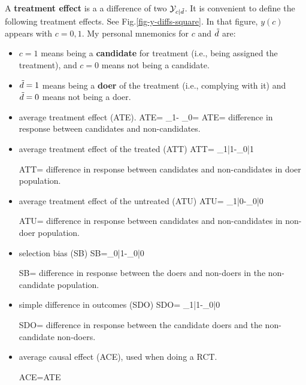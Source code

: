 A {\bf treatment effect} is a
a difference of two  ${\cal Y}_{c|{\tilde{d}} }$.
It is convenient to
define the following 
treatment effects. 
See Fig.\ref{fig-y-diffs-square}.
In that figure, $y(c)$ appears  with
$c=0,1$.
My personal mnemonics
for $c$ and ${\tilde{d}}$ are:
\begin{itemize}
\item
$c=1$ means being
a {\bf candidate} for treatment (i.e.,
being assigned the treatment),
and $c=0$ means not being a
candidate.
\item
${\tilde{d}}=1$ means being
a  {\bf doer} of the
treatment (i.e., 
complying with it)
and ${\tilde{d}}=0$
means not being a doer.
\end{itemize}



\begin{itemize}


\item average treatment effect
 (ATE).
\beq
{\color{red}ATE}=
\caly_{1}-
\caly_{0}= \delta
\eeq
ATE= difference in 
response between candidates
and non-candidates.

\item average treatment effect 
of the treated (ATT)
\beq
{\color{red}ATT}=
\caly_{1|1}-\caly_{0|1}
\eeq

ATT= difference in 
response between candidates
and non-candidates in doer 
population.

\item average
treatment effect of the untreated (ATU)
\beq
{\color{red}ATU}=
\caly_{1|0}-\caly_{0|0}
\eeq

ATU= difference in 
response between candidates
and non-candidates in non-doer 
population.

\item selection bias (SB)
\beq
{\color{red}SB}=\caly_{0|1}-\caly_{0|0}
\eeq

SB= difference in response
between the doers and non-doers
in the non-candidate population.

\item simple difference in outcomes (SDO)
\beq
{\color{red} SDO}= \caly_{1|1}-\caly_{0|0}
\eeq

SDO= difference in
response between the candidate doers
and the non-candidate non-doers.

\item average 
causal effect  
 (ACE), used when doing a RCT.

\beq
{\color{red}ACE}=ATE 
\eeq


\end{itemize}

